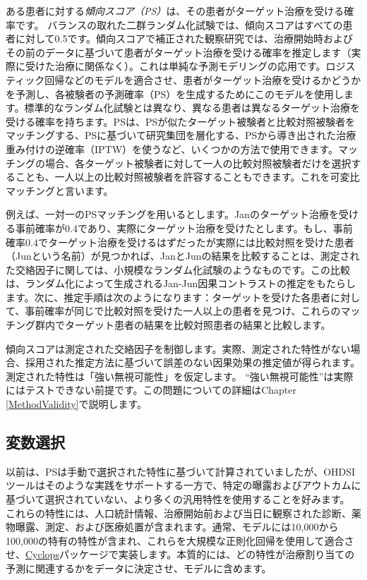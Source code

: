 \documentclass[
  11pt]{book}
\theoremstyle{definition}
\theoremstyle{definition}
\theoremstyle{definition}
\theoremstyle{definition}
\theoremstyle{remark}
\begin{document}
ある患者に対する\emph{傾向スコア（PS）}は、その患者がターゲット治療を受ける確率です。\citep[ ]{rosenbaum_1983} バランスの取れた二群ランダム化試験では、傾向スコアはすべての患者に対して0.5です。傾向スコアで補正された観察研究では、治療開始時およびその前のデータに基づいて患者がターゲット治療を受ける確率を推定します（実際に受けた治療に関係なく）。これは単純な予測モデリングの応用です。ロジスティック回帰などのモデルを適合させ、患者がターゲット治療を受けるかどうかを予測し、各被験者の予測確率（PS）を生成するためにこのモデルを使用します。標準的なランダム化試験とは異なり、異なる患者は異なるターゲット治療を受ける確率を持ちます。PSは、PSが似たターゲット被験者と比較対照被験者をマッチングする、PSに基づいて研究集団を層化する、PSから導き出された治療重み付けの逆確率（IPTW）を使うなど、いくつかの方法で使用できます。マッチングの場合、各ターゲット被験者に対して一人の比較対照被験者だけを選択することも、一人以上の比較対照被験者を許容することもできます。これを可変比マッチングと言います。\citep[ ]{rassen_2012}      

例えば、一対一のPSマッチングを用いるとします。Janのターゲット治療を受ける事前確率が0.4であり、実際にターゲット治療を受けたとします。もし、事前確率0.4でターゲット治療を受けるはずだったが実際には比較対照を受けた患者（Junという名前）が見つかれば、JanとJunの結果を比較することは、測定された交絡因子に関しては、小規模なランダム化試験のようなものです。この比較は、ランダム化によって生成されるJan-Jun因果コントラストの推定をもたらします。次に、推定手順は次のようになります：ターゲットを受けた各患者に対して、事前確率が同じで比較対照を受けた一人以上の患者を見つけ、これらのマッチング群内でターゲット患者の結果を比較対照患者の結果と比較します。

傾向スコアは測定された交絡因子を制御します。実際、測定された特性がない場合、採用された推定方法に基づいて誤差のない因果効果の推定値が得られます。測定された特性は「強い無視可能性」を仮定します。 ``強い無視可能性''は実際にはテストできない前提です。この問題についての詳細はChapter \ref{MethodValidity}で説明します。 

\subsection{変数選択}\label{VariableSelection}

以前は、PSは手動で選択された特性に基づいて計算されていましたが、OHDSIツールはそのような実践をサポートする一方で、特定の曝露およびアウトカムに基づいて選択されていない、より多くの汎用特性を使用することを好みます。\citep[ ]{tian_2018} これらの特性には、人口統計情報、治療開始前および当日に観察された診断、薬物曝露、測定、および医療処置が含まれます。通常、モデルには10,000から100,000の特有の特性が含まれ、これらを大規模な正則化回帰\citep[ ]{suchard_2013}を使用して適合させ、\href{https://ohdsi.github.io/Cyclops/}{Cyclops}パッケージで実装します。本質的には、どの特性が治療割り当ての予測に関連するかをデータに決定させ、モデルに含めます。
\end{document}
